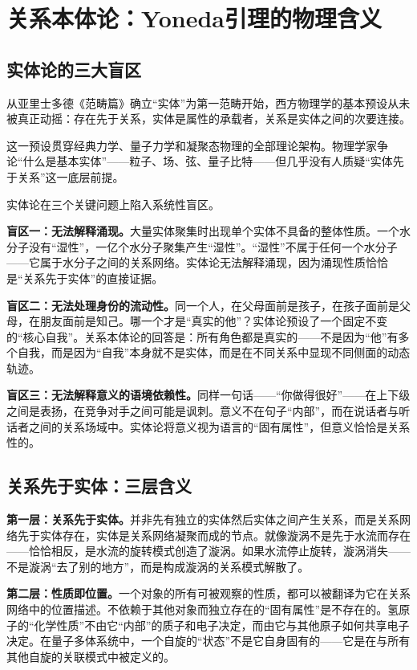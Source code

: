 \documentclass[11pt,a4paper]{book}
\theoremstyle{definition}
\begin{document}
\section{关系本体论：Yoneda引理的物理含义}

\subsection{实体论的三大盲区}

从亚里士多德《范畴篇》确立“实体”为第一范畴开始，西方物理学的基本预设从未被真正动摇：存在先于关系，实体是属性的承载者，关系是实体之间的次要连接。

这一预设贯穿经典力学、量子力学和凝聚态物理的全部理论架构。物理学家争论“什么是基本实体”——粒子、场、弦、量子比特——但几乎没有人质疑“实体先于关系”这一底层前提。

实体论在三个关键问题上陷入系统性盲区。

\textbf{盲区一：无法解释涌现。}大量实体聚集时出现单个实体不具备的整体性质。一个水分子没有“湿性”，一亿个水分子聚集产生“湿性”。“湿性”不属于任何一个水分子——它属于水分子之间的关系网络。实体论无法解释涌现，因为涌现性质恰恰是“关系先于实体”的直接证据。

\textbf{盲区二：无法处理身份的流动性。}同一个人，在父母面前是孩子，在孩子面前是父母，在朋友面前是知己。哪一个才是“真实的他”？实体论预设了一个固定不变的“核心自我”。关系本体论的回答是：所有角色都是真实的——不是因为“他”有多个自我，而是因为“自我”本身就不是实体，而是在不同关系中显现不同侧面的动态轨迹。

\textbf{盲区三：无法解释意义的语境依赖性。}同样一句话——“你做得很好”——在上下级之间是表扬，在竞争对手之间可能是讽刺。意义不在句子“内部”，而在说话者与听话者之间的关系场域中。实体论将意义视为语言的“固有属性”，但意义恰恰是关系性的。

\subsection{关系先于实体：三层含义}

\textbf{第一层：关系先于实体。}并非先有独立的实体然后实体之间产生关系，而是关系网络先于实体存在，实体是关系网络凝聚而成的节点。就像漩涡不是先于水流而存在——恰恰相反，是水流的旋转模式创造了漩涡。如果水流停止旋转，漩涡消失——不是漩涡“去了别的地方”，而是构成漩涡的关系模式解散了。

\textbf{第二层：性质即位置。}一个对象的所有可被观察的性质，都可以被翻译为它在关系网络中的位置描述。不依赖于其他对象而独立存在的“固有属性”是不存在的。氢原子的“化学性质”不由它“内部”的质子和电子决定，而由它与其他原子如何共享电子决定。在量子多体系统中，一个自旋的“状态”不是它自身固有的——它是在与所有其他自旋的关联模式中被定义的。
\end{document}
